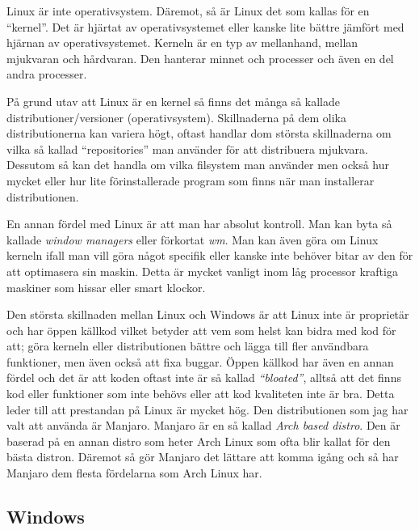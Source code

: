 \documentclass[12pt, a4paper]{report}
\begin{document}
   Linux är inte operativsystem. Däremot, så är Linux det som kallas för en ``kernel''\cite{redhat}. Det är hjärtat av operativsystemet eller kanske lite bättre jämfört med hjärnan av operativsystemet. Kerneln är en typ av mellanhand, mellan mjukvaran och hårdvaran. Den hanterar minnet och processer och även en del andra processer.
 
   På grund utav att Linux är en kernel så finns det många så kallade distributioner/versioner (operativsystem). Skillnaderna på dem olika distributionerna kan variera högt, oftast handlar dom största skillnaderna om vilka så kallad ``repositories'' man använder för att distribuera mjukvara. Dessutom så kan det handla om vilka filsystem man använder men också hur mycket eller hur lite förinstallerade program som finns när man installerar distributionen.


   En annan fördel med Linux är att man har absolut kontroll. Man kan byta så kallade \textit{window managers} eller förkortat \textit{wm}\cite{wm}. Man kan även göra om Linux kerneln ifall man vill göra något specifik eller kanske inte behöver bitar av den för att optimasera sin maskin. Detta är mycket vanligt inom låg processor kraftiga maskiner som hissar eller smart klockor.

   \vspace{1cm}


   Den största skillnaden mellan Linux och Windows är att Linux inte är proprietär och har öppen källkod vilket betyder att vem som helst kan bidra med kod för att; göra kerneln eller distributionen bättre och lägga till fler användbara funktioner, men även också att fixa buggar. Öppen källkod har även en annan fördel och det är att koden oftast inte är så kallad \textit{``bloated''}, alltså att det finns kod eller funktioner som inte behövs eller att kod kvaliteten inte är bra. Detta leder till att prestandan på Linux är mycket hög.
    \vspace{1cm}
   Den distributionen som jag har valt att använda är Manjaro\cite{manjaro}. Manjaro är en så kallad \textit{Arch based distro}. Den är baserad på en annan distro som heter Arch Linux som ofta blir kallat för den bästa distron. Däremot så gör Manjaro det lättare att komma igång och så har Manjaro dem flesta fördelarna som Arch Linux har.

   \subsection{Windows}
    
\end{document}
